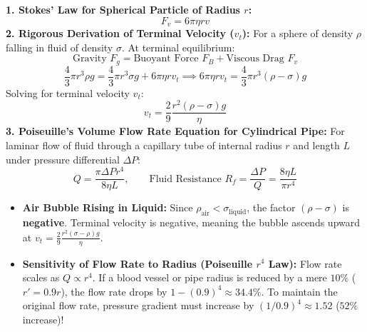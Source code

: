 \documentclass[10pt,twoside,openright]{book}
\begin{document}
\begin{formulabox}
\textbf{1. Stokes' Law for Spherical Particle of Radius $r$:}
\begin{equation}
  F_v = 6\pi\eta r v
\end{equation}
\textbf{2. Rigorous Derivation of Terminal Velocity ($v_t$):}
For a sphere of density $\rho$ falling in fluid of density $\sigma$. At terminal equilibrium:
\begin{equation}
  \text{Gravity } F_g = \text{Buoyant Force } F_B + \text{Viscous Drag } F_v
\end{equation}
\begin{equation}
  \frac{4}{3}\pi r^3 \rho g = \frac{4}{3}\pi r^3 \sigma g + 6\pi\eta r v_t \implies 6\pi\eta r v_t = \frac{4}{3}\pi r^3(\rho - \sigma)g
\end{equation}
Solving for terminal velocity $v_t$:
\begin{equation}
  v_t = \frac{2}{9}\frac{r^2(\rho - \sigma)g}{\eta}
\end{equation}
\textbf{3. Poiseuille's Volume Flow Rate Equation for Cylindrical Pipe:}
For laminar flow of fluid through a capillary tube of internal radius $r$ and length $L$ under pressure differential $\Delta P$:
\begin{equation}
  Q = \frac{\pi \Delta P r^4}{8\eta L}, \qquad \text{Fluid Resistance } R_f = \frac{\Delta P}{Q} = \frac{8\eta L}{\pi r^4}
\end{equation}
\end{formulabox}

\begin{trapbox}
\begin{itemize}
  \item \textbf{Air Bubble Rising in Liquid:} Since $\rho_{\text{air}} < \sigma_{\text{liquid}}$, the factor $(\rho - \sigma)$ is \textbf{negative}. Terminal velocity is negative, meaning the bubble ascends upward at $v_t = \frac{2}{9}\frac{r^2(\sigma - \rho)g}{\eta}$.
  \item \textbf{Sensitivity of Flow Rate to Radius (Poiseuille $r^4$ Law):} Flow rate scales as $Q \propto r^4$. If a blood vessel or pipe radius is reduced by a mere $10\%$ ($r' = 0.9r$), the flow rate drops by $1 - (0.9)^4 \approx 34.4\%$. To maintain the original flow rate, pressure gradient must increase by $(1/0.9)^4 \approx 1.52$ ($52\%$ increase)!
\end{itemize}
\end{trapbox}
\end{document}
